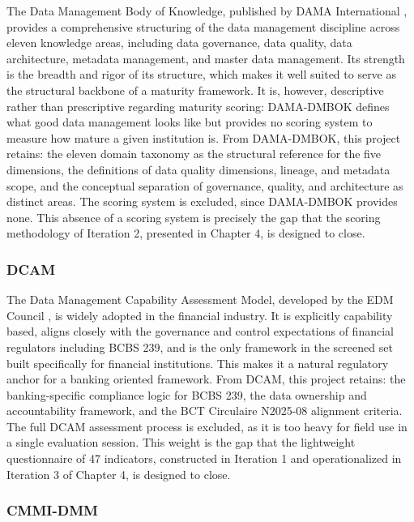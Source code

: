 The Data Management Body of Knowledge, published by DAMA International \cite{dama2017}, provides a comprehensive structuring of the data management discipline across eleven knowledge areas, including data governance, data quality, data architecture, metadata management, and master data management. Its strength is the breadth and rigor of its structure, which makes it well suited to serve as the structural backbone of a maturity framework. It is, however, descriptive rather than prescriptive regarding maturity scoring: DAMA-DMBOK defines what good data management looks like but provides no scoring system to measure how mature a given institution is. From DAMA-DMBOK, this project retains: the eleven domain taxonomy as the structural reference for the five dimensions, the definitions of data quality dimensions, lineage, and metadata scope, and the conceptual separation of governance, quality, and architecture as distinct areas. The scoring system is excluded, since DAMA-DMBOK provides none. This absence of a scoring system is precisely the gap that the scoring methodology of Iteration 2, presented in Chapter 4, is designed to close.

\subsubsection{DCAM}

The Data Management Capability Assessment Model, developed by the EDM Council \cite{dcam}, is widely adopted in the financial industry. It is explicitly capability based, aligns closely with the governance and control expectations of financial regulators including BCBS 239, and is the only framework in the screened set built specifically for financial institutions. This makes it a natural regulatory anchor for a banking oriented framework. From DCAM, this project retains: the banking-specific compliance logic for BCBS 239, the data ownership and accountability framework, and the BCT Circulaire N\textdegree{}2025-08 alignment criteria. The full DCAM assessment process is excluded, as it is too heavy for field use in a single evaluation session. This weight is the gap that the lightweight questionnaire of 47 indicators, constructed in Iteration 1 and operationalized in Iteration 3 of Chapter 4, is designed to close.

\subsubsection{CMMI-DMM}

